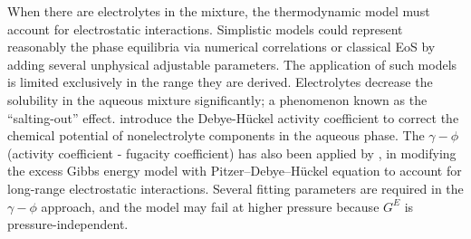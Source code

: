 When there are electrolytes in the mixture, the thermodynamic model must account for electrostatic interactions. Simplistic models could represent reasonably the phase equilibria via numerical correlations \cite{Sun2021}
or classical EoS \cite{Bian2019, Yang2024} by adding several unphysical adjustable parameters. The application of such models is limited exclusively in the range they are derived. Electrolytes decrease the  solubility in the aqueous mixture significantly; a phenomenon known as the ``salting-out'' effect. \citeauthor{Li2020} \cite{Li2020} introduce the Debye-H\"uckel activity coefficient to correct the chemical potential of nonelectrolyte components in the aqueous phase. The $\gamma-\phi$ (activity coefficient - fugacity coefficient) has also been applied  by \citeauthor{Springer2012} \cite{Springer2012}, in modifying the excess Gibbs energy model with  Pitzer–Debye–H\"uckel equation to account for long-range electrostatic interactions. Several fitting parameters are required in the $\gamma-\phi$ approach, and the model may fail at higher pressure because $G^E$ is pressure-independent.

